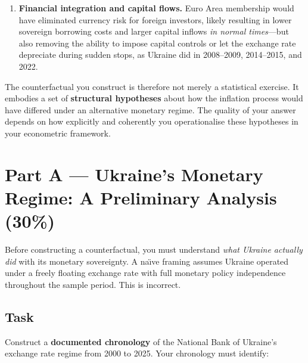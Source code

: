 \documentclass[11pt,a4paper]{article}
\begin{document}
\begin{enumerate}[leftmargin=2em]
  \item \textbf{Financial integration and capital flows.}
  Euro Area membership would have eliminated currency risk for foreign investors,
  likely resulting in lower sovereign borrowing costs and larger capital inflows
  \emph{in normal times}---but also removing the ability to impose capital
  controls or let the exchange rate depreciate during sudden stops, as Ukraine
  did in 2008--2009, 2014--2015, and 2022.

\end{enumerate}

The counterfactual you construct is therefore not merely a statistical exercise.
It embodies a set of \textbf{structural hypotheses} about how the inflation
process would have differed under an alternative monetary regime. The quality of
your answer depends on how explicitly and coherently you operationalise these
hypotheses in your econometric framework.


\section*{Part A --- Ukraine's Monetary Regime: A Preliminary Analysis (30\%)}

Before constructing a counterfactual, you must understand \emph{what Ukraine
actually did} with its monetary sovereignty. A na\"{\i}ve framing assumes
Ukraine operated under a freely floating exchange rate with full monetary policy
independence throughout the sample period. This is incorrect.

\subsection*{Task}

Construct a \textbf{documented chronology} of the National Bank of Ukraine's
exchange rate regime from 2000 to 2025. Your chronology must identify:
\end{document}
